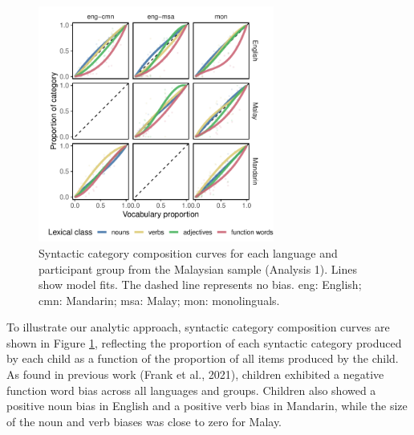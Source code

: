 \documentclass[10pt, letterpaper]{article}
\begin{document}
\begin{CodeChunk}
\begin{figure}[t]

{\centering \includegraphics[width=220pt]{figs/my_prop-1} 

}

\caption[Syntactic category composition curves for each language and participant group from the Malaysian sample (Analysis 1)]{Syntactic category composition curves for each language and participant group from the Malaysian sample (Analysis 1). Lines show model fits. The dashed line represents no bias. eng: English; cmn: Mandarin; msa: Malay; mon: monolinguals.}\label{fig:my_prop}
\end{figure}
\end{CodeChunk}

To illustrate our analytic approach, syntactic category composition
curves are shown in Figure \ref{fig:my_prop}, reflecting the proportion
of each syntactic category produced by each child as a function of the
proportion of all items produced by the child. As found in previous work
(Frank et al., 2021), children exhibited a negative function word bias
across all languages and groups. Children also showed a positive noun
bias in English and a positive verb bias in Mandarin, while the size of
the noun and verb biases was close to zero for Malay.
\end{document}
